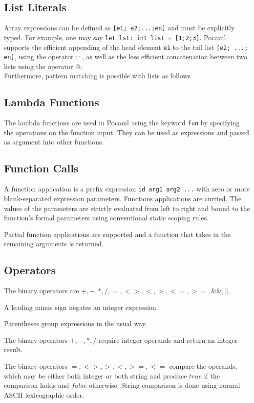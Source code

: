 \documentclass[journal]{IEEEtran}
\begin{document}
\subsection{List Literals}
Array expressions can be defined as \texttt{[e1; e2;...;en]} and must be explicitly typed. For example, one may say 
\texttt{let lst: int list = [1;2;3]}.
Pocaml supports the efficient appending of the head element \texttt{e1} to the tail list \texttt{[e2; ...; en]}, using the operator $::$, as well as the less efficient concatenation between two lists using the operator $@$.\\
Furthermore, pattern matching is possible with lists as follows

\subsection{Lambda Functions}
The lambda functions are used in Pocaml using the keyword \texttt{fun} by specifying the operations on the function input.  They can be used as expressions and passed as argument into other functions.

\subsection{Function Calls}
A function application is a prefix expression \texttt{id arg1 arg2 ...}
with zero or more blank-separated expression parameters. Functions applications are curried. The values of the parameters are strictly evaluated from left to right and bound to the function's formal parameters using conventional static scoping rules.

Partial function applications are supported and a function that takes in the remaining arguments is returned.

\subsection{Operators}
The binary operators are $+, -, *, /, =, <>, <, >, <=, >=, \&\&, ||$.

A leading minus sign negates an integer expression.

Parentheses group expressions in the usual way.

The binary operators $+, -, *, /$ require integer operands and return an integer result.

The binary operators $=, <>, >, <, >=, <=$ compare the operands, which may be either both integer or both string and produce $true$ if the comparison holds and $false$ otherwise. String comparison is done using normal ASCII lexicographic order.
\end{document}
